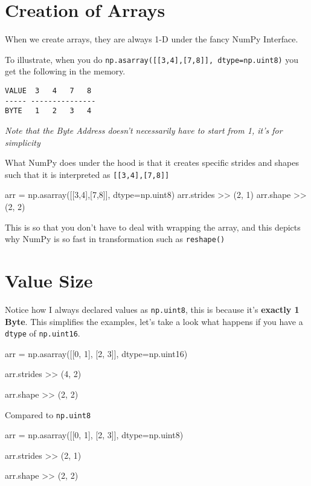 \documentclass[oneside, 12pt]{report}
\begin{document}
\section{Creation of Arrays}

When we create arrays, they are always 1-D under the fancy NumPy Interface.

To illustrate, when you do \verb+np.asarray([[3,4],[7,8]], dtype=np.uint8)+ you get the following in the memory.

\begin{verbatim}
VALUE  3   4   7   8
----- ---------------
BYTE   1   2   3   4
\end{verbatim}

\textit{Note that the Byte Address doesn't necessarily have to start from 1, it's for simplicity}

What NumPy does under the hood is that it creates specific strides and shapes such that it is interpreted as \verb+[[3,4],[7,8]]+

\begin{python}
arr = np.asarray([[3,4],[7,8]], dtype=np.uint8)
arr.strides
>> (2, 1)
arr.shape
>> (2, 2)
\end{python}

This is so that you don't have to deal with wrapping the array, and this depicts why NumPy is so fast in transformation such as \verb+reshape()+

\section{Value Size}

Notice how I always declared values as \verb+np.uint8+, this is because it's \textbf{exactly 1 Byte}. This simplifies the examples, let's take a look what happens if you have a \verb+dtype+ of \verb+np.uint16+.

\begin{python}
arr = np.asarray([[0, 1], [2, 3]], dtype=np.uint16)

arr.strides
>> (4, 2)

arr.shape
>> (2, 2)
\end{python}

Compared to \verb+np.uint8+

\begin{python}
arr = np.asarray([[0, 1], [2, 3]], dtype=np.uint8)

arr.strides
>> (2, 1)

arr.shape
>> (2, 2)
\end{python}
\end{document}
